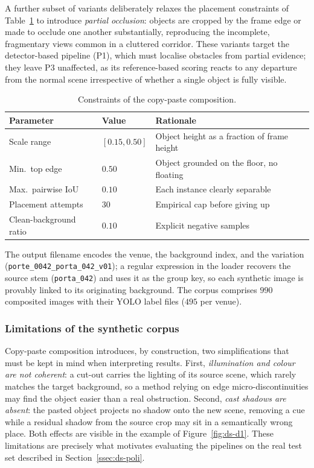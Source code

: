 A further subset of variants deliberately relaxes the placement constraints of
Table~\ref{tab:ds-copypaste} to introduce \emph{partial occlusion}: objects are
cropped by the frame edge or made to occlude one another substantially,
reproducing the incomplete, fragmentary views common in a cluttered corridor.
These variants target the detector-based pipeline (P1), which must localise
obstacles from partial evidence; they leave P3 unaffected, as its reference-based
scoring reacts to any departure from the normal scene irrespective of whether a
single object is fully visible.

\begin{table}[h]
  \centering
  \begin{tabular}{lll}
    \hline
    Parameter & Value & Rationale \\
    \hline
    Scale range & $[0.15, 0.50]$ & Object height as a fraction of frame height \\
    Min.\ top edge & $0.50$ & Object grounded on the floor, no floating \\
    Max.\ pairwise IoU & $0.10$ & Each instance clearly separable \\
    Placement attempts & $30$ & Empirical cap before giving up \\
    Clean-background ratio & $0.10$ & Explicit negative samples \\
    \hline
  \end{tabular}
  \caption{Constraints of the copy-paste composition.}
  \label{tab:ds-copypaste}
\end{table}

The output filename encodes the venue, the background index, and the variation
(\texttt{porte\_0042\_porta\_042\_v01}); a regular expression in the loader
recovers the source stem (\texttt{porta\_042}) and uses it as the group key, so
each synthetic image is provably linked to its originating background. The corpus
comprises $990$ composited images with their YOLO label files
($495$ per venue).

\subsubsection{Limitations of the synthetic corpus}

Copy-paste composition introduces, by construction, two simplifications that
must be kept in mind when interpreting results. First, \emph{illumination and
colour are not coherent}: a cut-out carries the lighting of its source scene,
which rarely matches the target background, so a method relying on edge
micro-discontinuities may find the object easier than a real obstruction.
Second, \emph{cast shadows are absent}: the pasted object projects no shadow onto
the new scene, removing a cue while a residual shadow from the
source crop may sit in a semantically wrong place. Both effects are visible in the
example of Figure~\ref{fig:ds-d1}. These
limitations are precisely what motivates evaluating the pipelines on the real
test set described in Section~\ref{ssec:ds-poli}.


